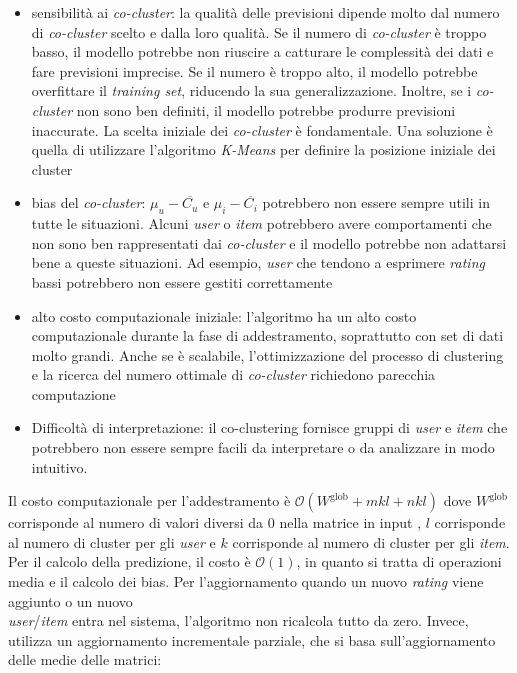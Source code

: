 \begin{itemize}
  \item sensibilità ai \textit{co-cluster}: la qualità delle previsioni dipende molto dal numero di \textit{co-cluster} scelto e dalla loro qualità. Se il numero di \textit{co-cluster} è troppo basso, il modello potrebbe non riuscire a catturare le complessità dei dati e fare previsioni imprecise. Se il numero è troppo alto, il modello potrebbe overfittare il \textit{training set}, riducendo la sua generalizzazione. Inoltre, se i \textit{co-cluster} non sono ben definiti, il modello potrebbe produrre previsioni inaccurate. La scelta iniziale dei \textit{co-cluster} è fondamentale. Una soluzione è quella di utilizzare l'algoritmo \textit{K-Means} per definire la posizione iniziale dei cluster
  \item bias del \textit{co-cluster}: $\mu_u - \overline{C_u} $ e $ \mu_i - \overline{C_i}$ potrebbero non essere sempre utili in tutte le situazioni. Alcuni \textit{user} o \textit{item} potrebbero avere comportamenti che non sono ben rappresentati dai \textit{co-cluster} e il modello potrebbe non adattarsi bene a queste situazioni. Ad esempio, \textit{user} che tendono a esprimere \textit{rating} bassi potrebbero non essere gestiti correttamente
  \item alto costo computazionale iniziale: l'algoritmo ha un alto costo computazionale durante la fase di addestramento, soprattutto con set di dati molto grandi. Anche se è scalabile, l'ottimizzazione del processo di clustering e la ricerca del numero ottimale di \textit{co-cluster} richiedono parecchia computazione
  \item Difficoltà di interpretazione: il co-clustering fornisce gruppi di \textit{user} e \textit{item} che potrebbero non essere sempre facili da interpretare o da analizzare in modo intuitivo.
\end{itemize}

Il costo computazionale per l'addestramento è $ \mathcal{O}(W^{\text{glob}} + mkl + nkl) $ dove $ W^{\text{glob}} $ corrisponde al numero di valori diversi da $0$ nella matrice in input , $l$ corrisponde al numero di cluster per gli \textit{user} e $k$ corrisponde al numero di cluster per gli \textit{item}. Per il calcolo della predizione, il costo è $\mathcal{O}(1)$, in quanto si tratta di operazioni media e il calcolo dei bias. Per l'aggiornamento quando un nuovo \textit{rating} viene aggiunto o un nuovo \\ \textit{user}/\textit{item} entra nel sistema, l'algoritmo non ricalcola tutto da zero. Invece, utilizza un aggiornamento incrementale parziale, che si basa sull'aggiornamento delle medie delle matrici:


